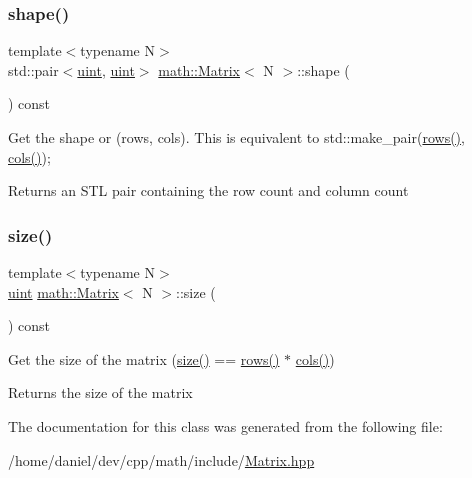 \subsubsection{\texorpdfstring{shape()}{shape()}}
{\footnotesize\ttfamily template$<$typename N$>$ \\
std\+::pair$<$\hyperlink{typedefs_8h_a7b9b9413622e67b9df7f2d090b48682b}{uint}, \hyperlink{typedefs_8h_a7b9b9413622e67b9df7f2d090b48682b}{uint}$>$ \hyperlink{classmath_1_1Matrix}{math\+::\+Matrix}$<$ N $>$\+::shape (\begin{DoxyParamCaption}{ }\end{DoxyParamCaption}) const\hspace{0.3cm}{\ttfamily [inline]}}

Get the shape or (rows, cols). This is equivalent to {\ttfamily std\+::make\+\_\+pair(\hyperlink{classmath_1_1Matrix_a602173645d806afe305ed77b1ff38273}{rows()}, \hyperlink{classmath_1_1Matrix_ad78b49e12a607856df124a18a855aaf1}{cols()});} \begin{DoxyReturn}{Returns}
an S\+TL pair containing the row count and column count 
\end{DoxyReturn}
\mbox{\label{classmath_1_1Matrix_ae99135c51efc0077b694ab37ad64d5c0}} 
\subsubsection{\texorpdfstring{size()}{size()}}
{\footnotesize\ttfamily template$<$typename N$>$ \\
\hyperlink{typedefs_8h_a7b9b9413622e67b9df7f2d090b48682b}{uint} \hyperlink{classmath_1_1Matrix}{math\+::\+Matrix}$<$ N $>$\+::size (\begin{DoxyParamCaption}{ }\end{DoxyParamCaption}) const\hspace{0.3cm}{\ttfamily [inline]}}

Get the size of the matrix ({\ttfamily \hyperlink{classmath_1_1Matrix_ae99135c51efc0077b694ab37ad64d5c0}{size()} == \hyperlink{classmath_1_1Matrix_a602173645d806afe305ed77b1ff38273}{rows()} $\ast$ \hyperlink{classmath_1_1Matrix_ad78b49e12a607856df124a18a855aaf1}{cols()}}) \begin{DoxyReturn}{Returns}
the size of the matrix 
\end{DoxyReturn}


The documentation for this class was generated from the following file\+:\begin{DoxyCompactItemize}
\item 
/home/daniel/dev/cpp/math/include/\hyperlink{Matrix_8hpp}{Matrix.\+hpp}\end{DoxyCompactItemize}
